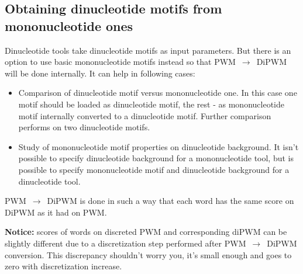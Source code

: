 \subsection{Obtaining dinucleotide motifs from mononucleotide ones}
Dinucleotide tools take dinucleotide motifs as input parameters. But there is an option  to use basic mononucleotide motifs instead so that PWM~$\rightarrow$~DiPWM will be done internally. It can help in following cases:
\begin{itemize}
\item Comparison of dinucleotide motif versus mononucleotide one. In this case one motif should be loaded as dinucleotide motif, the rest - as mononucleotide motif internally converted to a dinucleotide motif. Further comparison performs on two dinucleotide motifs.
\item Study of mononucleotide motif properties on dinucleotide background. It isn't possible to specify dinucleotide background for a mononucleotide tool, but is possible to specify mononucleotide motif and dinucleotide background for a dinucleotide tool. 
\end{itemize}

PWM~$\rightarrow$~DiPWM is done in such a way that each word has the same score on DiPWM as it had on PWM.

{\small\textbf{Notice:} scores of words on discreted PWM and corresponding diPWM can be slightly different due to a discretization step performed after PWM~$\rightarrow$~DiPWM conversion. This discrepancy shouldn't worry you, it's small enough and goes to zero with discretization increase.}
